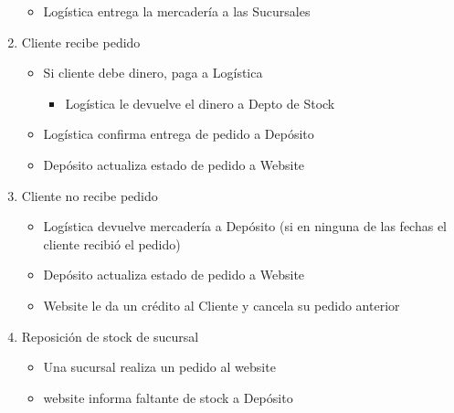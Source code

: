 \begin{enumerate}
\begin{itemize}
        \item Logística entrega la mercadería a las Sucursales

      \end{itemize}

      \item Cliente recibe pedido

      \begin{itemize}

        \item Si cliente debe dinero, paga a Logística

        \begin{itemize}

          \item Logística le devuelve el dinero a Depto de Stock

        \end{itemize}

        \item Logística confirma entrega de pedido a Depósito

        \item Depósito actualiza estado de pedido a Website

      \end{itemize}

      \item Cliente no recibe pedido

      \begin{itemize}

        \item Logística devuelve mercadería a Depósito (si en ninguna de las
        fechas el cliente recibió el pedido)

        \item Depósito actualiza estado de pedido a Website

        \item Website le da un crédito al Cliente y cancela su pedido anterior

      \end{itemize}

      \item Reposición de stock de sucursal

      \begin{itemize}

        \item Una sucursal realiza un pedido al website

        \item website informa faltante de stock a Depósito


\end{itemize}
\end{enumerate}
